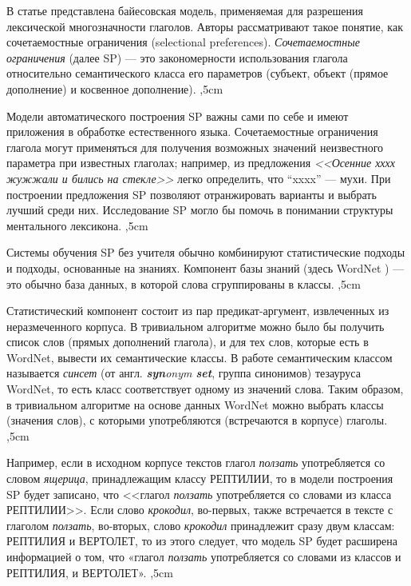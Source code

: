 \documentclass{article}
\begin{document}
\begin{articletext}
В статье \cite{Ciaramita 2000} представлена байесовская модель, применяемая для разрешения лексической многозначности глаголов. Авторы рассматривают такое понятие, как сочетаемостные ограничения (selectional preferences). \textit{Сочетаемостные ограничения} (далее SP) --- это закономерности использования глагола относительно семантического класса его параметров (субъект, объект (прямое дополнение) и косвенное дополнение).
,5cm

Модели автоматического построения SP важны сами по себе и имеют приложения в обработке естественного языка. Сочетаемостные ограничения глагола могут применяться для получения возможных значений неизвестного параметра при известных глаголах; например, из предложения \textit{<<Осенние хххх жужжали и бились на стекле>>} легко определить, что “xxxx” --- мухи. При построении предложения SP позволяют отранжировать варианты и выбрать лучший среди них. Исследование SP могло бы помочь в понимании структуры ментального лексикона. 
,5cm

Системы обучения SP без учителя обычно комбинируют статистические подходы и подходы, основанные на знаниях. Компонент базы знаний (здесь WordNet \cite{Miller 1990}) --- это обычно база данных, в которой слова сгруппированы в классы. 
,5cm

Статистический компонент состоит из пар предикат-аргумент, извлеченных из неразмеченного корпуса. В тривиальном алгоритме можно было бы получить список слов (прямых дополнений глагола), и для тех слов, которые есть в WordNet, вывести их семантические классы. В работе \cite{Ciaramita 2000} семантическим классом называется \textit{синсет} (от англ. \textit{\textbf{syn}onym \textbf{set}}, группа синонимов) тезауруса WordNet, то есть класс соответствует одному из значений слова. Таким образом, в тривиальном алгоритме на основе данных WordNet можно выбрать классы (значения слов), с которыми употребляются (встречаются в корпусе) глаголы.
,5cm

Например, если в исходном корпусе текстов глагол \textit{ползать} употребляется со словом \textit{ящерица}, принадлежащим классу РЕПТИЛИИ, то в модели построения SP будет записано, что <<глагол \textit{ползать} употребляется со словами из класса РЕПТИЛИИ>>. Если слово \textit{крокодил}, во-первых, также встречается в тексте с глаголом \textit{ползать}, во-вторых, слово \textit{крокодил} принадлежит сразу двум классам: РЕПТИЛИЯ и ВЕРТОЛЕТ, то из этого следует, что модель SP будет расширена информацией о том, что «глагол \textit{ползать} употребляется со словами из классов и РЕПТИЛИЯ, и ВЕРТОЛЕТ».
,5cm


\end{articletext}
\end{document}
